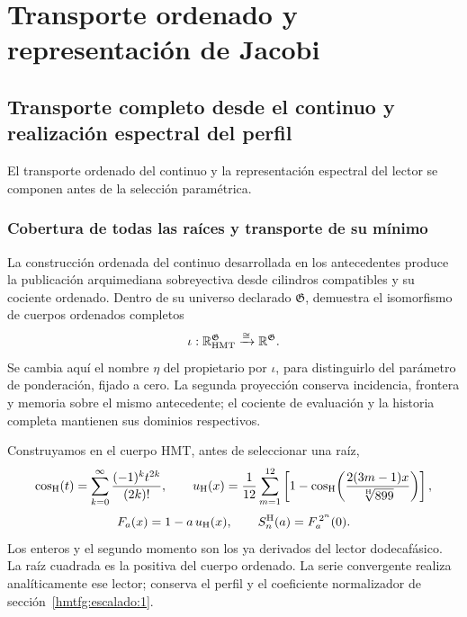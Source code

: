 \section{Transporte ordenado y representación de Jacobi}
\label{hmtfg:fragmento:transporte-ordenado-y-representacion-de-jacobi}

\subsection{Transporte completo desde el continuo y realización espectral del perfil}
\label{hmtfg:escalado:14}

El transporte ordenado del continuo y la representación espectral del lector se componen antes de la selección paramétrica.

\subsubsection{Cobertura de todas las raíces y transporte de su mínimo}
\label{hmtfg:escalado:14.1}

La construcción ordenada del continuo desarrollada en los antecedentes produce la publicación arquimediana sobreyectiva desde cilindros compatibles y su cociente ordenado. Dentro de su universo declarado \(\mathfrak G\), demuestra el isomorfismo de cuerpos ordenados completos
\begin{equation}
\iota:\mathbb R_{\rm HMT}^{\mathfrak G}
   \xrightarrow{\cong}\mathbb R^{\mathfrak G}.
\label{hmtfg:escalado:eq:37}
\end{equation}
Se cambia aquí el nombre \(\eta\) del propietario por \(\iota\), para distinguirlo del parámetro de ponderación, fijado a cero. La segunda proyección conserva incidencia, frontera y memoria sobre el mismo antecedente; el cociente de evaluación y la historia completa mantienen sus dominios respectivos.

Construyamos en el cuerpo HMT, antes de seleccionar una raíz,
\[
\cos_{\rm H}(t)=\sum_{k=0}^{\infty}\frac{(-1)^kt^{2k}}{(2k)!},
\qquad
u_{\rm H}(x)=\frac1{12}\sum_{m=1}^{12}
\left[1-\cos_{\rm H}\!\left(\frac{2(3m-1)x}{\sqrt[\rm H]{899}}\right)\right],
\]
\begin{equation}
F_a(x)=1-a\,u_{\rm H}(x),\qquad S_n^{\rm H}(a)=F_a^{\,2^n}(0).
\label{hmtfg:escalado:eq:38}
\end{equation}
Los enteros y el segundo momento son los ya derivados del lector dodecafásico. La raíz cuadrada es la positiva del cuerpo ordenado. La serie convergente realiza analíticamente ese lector; conserva el perfil y el coeficiente normalizador de sección~\ref{hmtfg:escalado:1}.

